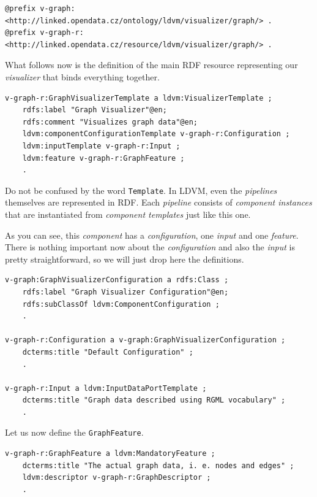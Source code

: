 \scriptsize
\begin{verbatim}
@prefix v-graph: <http://linked.opendata.cz/ontology/ldvm/visualizer/graph/> .
@prefix v-graph-r: <http://linked.opendata.cz/resource/ldvm/visualizer/graph/> .
\end{verbatim}
\normalsize

What follows now is the definition of the main RDF resource representing our \emph{visualizer} that binds everything together.

\scriptsize
\begin{verbatim}
v-graph-r:GraphVisualizerTemplate a ldvm:VisualizerTemplate ;
    rdfs:label "Graph Visualizer"@en;
    rdfs:comment "Visualizes graph data"@en;
    ldvm:componentConfigurationTemplate v-graph-r:Configuration ;
    ldvm:inputTemplate v-graph-r:Input ;
    ldvm:feature v-graph-r:GraphFeature ;
    .
\end{verbatim}
\normalsize

Do not be confused by the word \texttt{Template}. In LDVM, even the \emph{pipelines} themselves are represented in RDF. Each \emph{pipeline} consists of \emph{component instances} that are instantiated from \emph{component templates} just like this one.

As you can see, this \emph{component} has a \emph{configuration}, one \emph{input} and one \emph{feature}. There is nothing important now about the \emph{configuration} and also the \emph{input} is pretty straightforward, so we will just drop here the definitions.

\scriptsize
\begin{verbatim}
v-graph:GraphVisualizerConfiguration a rdfs:Class ;
    rdfs:label "Graph Visualizer Configuration"@en;
    rdfs:subClassOf ldvm:ComponentConfiguration ;
    .
  
v-graph-r:Configuration a v-graph:GraphVisualizerConfiguration ;
    dcterms:title "Default Configuration" ;
    .

v-graph-r:Input a ldvm:InputDataPortTemplate ;
    dcterms:title "Graph data described using RGML vocabulary" ;
    .
\end{verbatim}
\normalsize

Let us now define the \texttt{GraphFeature}.

\scriptsize
\begin{verbatim}
v-graph-r:GraphFeature a ldvm:MandatoryFeature ;
    dcterms:title "The actual graph data, i. e. nodes and edges" ;
    ldvm:descriptor v-graph-r:GraphDescriptor ;
    .
\end{verbatim}
\normalsize

